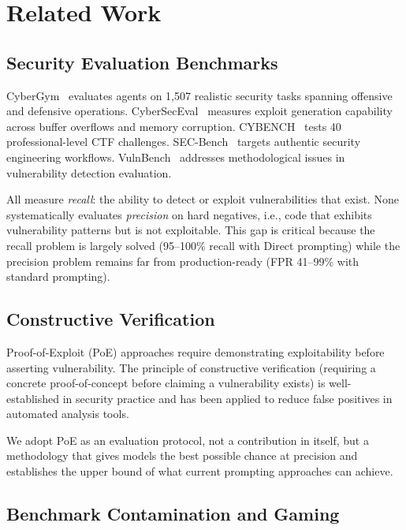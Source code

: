 \documentclass[conference]{IEEEtran}
\begin{document}
\section{Related Work}
\label{sec:related}

\subsection{Security Evaluation Benchmarks}

CyberGym~\cite{cybergym} evaluates agents on 1,507 realistic security tasks spanning offensive and defensive operations. CyberSecEval~\cite{cyberseceval} measures exploit generation capability across buffer overflows and memory corruption. CYBENCH~\cite{cybench} tests 40 professional-level CTF challenges. SEC-Bench~\cite{secbench} targets authentic security engineering workflows. VulnBench~\cite{vulnbench} addresses methodological issues in vulnerability detection evaluation.

All measure \emph{recall}: the ability to detect or exploit vulnerabilities that exist. None systematically evaluates \emph{precision} on hard negatives, i.e., code that exhibits vulnerability patterns but is not exploitable. This gap is critical because the recall problem is largely solved (95--100\% recall with Direct prompting) while the precision problem remains far from production-ready (FPR 41--99\% with standard prompting).

\subsection{Constructive Verification}

Proof-of-Exploit (PoE) approaches require demonstrating exploitability before asserting vulnerability. The principle of constructive verification (requiring a concrete proof-of-concept before claiming a vulnerability exists) is well-established in security practice and has been applied to reduce false positives in automated analysis tools.

We adopt PoE as an evaluation protocol, not a contribution in itself, but a methodology that gives models the best possible chance at precision and establishes the upper bound of what current prompting approaches can achieve.

\subsection{Benchmark Contamination and Gaming}
\end{document}
